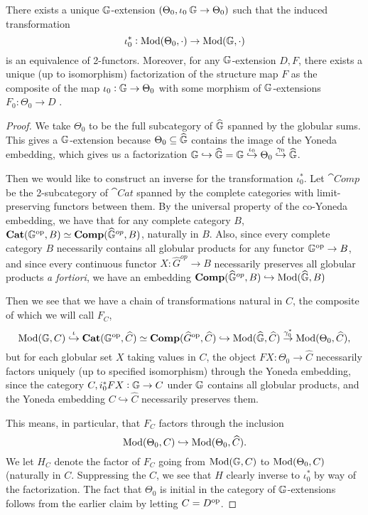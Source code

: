 \begin{prop}
There exists a unique \(\mathbb{G}\)-extension \((\Theta_0,\iota_0\:\mathbb{G}\to \Theta_0)\) such that the induced transformation 
\[\iota_0^*:\operatorname{Mod}(\Theta_0,\cdot)\to \operatorname{Mod}(\mathbb{G},\cdot)\]
is an equivalence of 2-functors.  Moreover, for any \(\mathbb{G}\)-extension \(D,F\), there exists a unique (up to isomorphism) factorization of the structure map \(F\) as the composite of the map \(\iota_0:\mathbb{G}\to \Theta_0\) with some morphism of \(\mathbb{G}\)-extensions \(F_0:\Theta_0\to D\) .  
\end{prop}
\begin{proof}
We take \(\Theta_0\) to be the full subcategory of \(\widehat{\mathbb{G}}\) spanned by the globular sums.  This gives a \(\mathbb{G}\)-extension because \(\Theta_0\subseteq \widehat{\mathbb{G}}\) contains the image of the Yoneda embedding, which gives us a factorization \(\mathbb{G}\hookrightarrow \widehat{\mathbb{G}}=\mathbb{G}\overset{\iota_0}{\hookrightarrow} \Theta_0\overset{\gamma_0}{\hookrightarrow}\widehat{\mathbb{G}}\).   

Then we would like to construct an inverse for the transformation \(\iota_0^\ast\). Let \(\cat{Comp}\) be the 2-subcategory of \(\cat{Cat}\) spanned by the complete categories with limit-preserving functors between them.  By the universal property of the co-Yoneda embedding, we have that for any complete category \(B\), \({\operatorname{\mathbf{Cat}}}(\mathbb{G}^{\operatorname{op}},B)\simeq {\operatorname{\mathbf{Comp}}}(\widehat{\mathbb{G}}^{op},B)\), naturally in \(B\). Also, since every complete category \(B\) necessarily contains all globular products for any functor \(\mathbb{G}^{\operatorname{op}}\to B\), and since every continuous functor \(X:\widehat{G}^{op}\to B\) necessarily preserves all globular products \emph{a fortiori}, we have an embedding \({\operatorname{\mathbf{Comp}}}(\widehat{\mathbb{G}}^{op},B)\hookrightarrow \operatorname{Mod}(\widehat{\mathbb{G}},B)\)  

Then we see that we have a chain of transformations natural in \(C\), the composite of which we will call \(F_C\),
\[\operatorname{Mod}(\mathbb{G},C)\overset{\iota}{\hookrightarrow} {\operatorname{\mathbf{Cat}}}(\mathbb{G}^{\operatorname{op}},\widehat{C}) \simeq {\operatorname{\mathbf{Comp}}}(\widehat{G}^{\operatorname{op}},\widehat{C})\hookrightarrow\operatorname{Mod}(\widehat{\mathbb{G}},\widehat{C})\overset{\gamma_0^\ast}{\to} \operatorname{Mod}(\Theta_0,\widehat{C}),\]
but for each globular set \(X\) taking values in \(C\), the object \(FX:\Theta_0\to \widehat{C}\) necessarily factors uniquely (up to specified isomorphism) through the Yoneda embedding, since the category \(C,i_0^\ast FX:\mathbb{G}\to C\) under \(\mathbb{G}\) contains all globular products, and the Yoneda embedding \(C\hookrightarrow \widehat{C}\) necessarily preserves them.  

This means, in particular, that \(F_C\) factors through the inclusion \[\operatorname{Mod}(\Theta_0,C)\hookrightarrow \operatorname{Mod}(\Theta_0,\widehat{C}).\]  We let \(H_C\) denote the factor of \(F_C\) going from \(\operatorname{Mod}(\mathbb{G},C)\) to \(\operatorname{Mod}(\Theta_0,C)\) (naturally in \(C\).  Suppressing the \(C\), we see that \(H\) clearly inverse to \(\iota_0^\ast\) by way of the factorization.   The fact that \(\Theta_0\) is initial in the category of \(\mathbb{G}\)-extensions follows from the earlier claim by letting \(C=D^{\operatorname{op}}\).
\end{proof}


